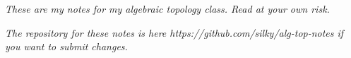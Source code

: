 \textit{These are my notes for my algebraic topology class. Read at your own risk.} 

\textit{The repository for these notes is here https://github.com/silky/alg-top-notes if you want to submit changes.}